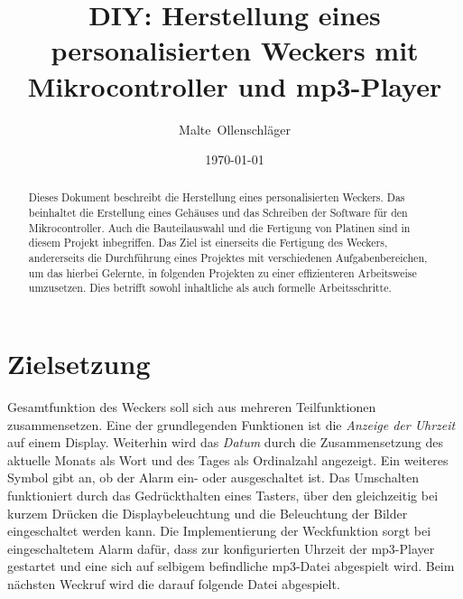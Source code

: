 \documentclass[journal, a4paper]{IEEEtran}
\date{\today}
\author{Malte~Ollenschläger}
\title{DIY: Herstellung eines personalisierten Weckers mit Mikrocontroller und mp3-Player}
\begin{document}
\maketitle
\begin{abstract}
	Dieses Dokument beschreibt die Herstellung eines personalisierten Weckers. Das beinhaltet die Erstellung eines Gehäuses und das Schreiben der Software für den Mikrocontroller. Auch die Bauteilauswahl und die Fertigung von Platinen sind in diesem Projekt inbegriffen. Das Ziel ist einerseits die Fertigung des Weckers, andererseits die Durchführung eines Projektes mit verschiedenen Aufgabenbereichen, um das hierbei Gelernte, in folgenden Projekten zu einer effizienteren Arbeitsweise umzusetzen. Dies betrifft sowohl inhaltliche als auch formelle Arbeitsschritte.
\end{abstract}


\section{Zielsetzung}
	 Gesamtfunktion des Weckers soll sich aus mehreren Teilfunktionen zusammensetzen. Eine der grundlegenden Funktionen ist die \textit{Anzeige der Uhrzeit} auf einem Display. Weiterhin wird das \textit{Datum} durch die Zusammensetzung des aktuelle Monats als Wort und des Tages als Ordinalzahl angezeigt. %
	Ein weiteres Symbol gibt an, ob der Alarm ein- oder ausgeschaltet ist. Das Umschalten funktioniert durch das Gedrückthalten eines Tasters, über den gleichzeitig bei kurzem Drücken die Displaybeleuchtung und die Beleuchtung der Bilder eingeschaltet werden kann. Die Implementierung der Weckfunktion sorgt bei eingeschaltetem Alarm dafür, dass zur konfigurierten Uhrzeit der mp3-Player gestartet und eine sich auf selbigem befindliche mp3-Datei abgespielt wird. Beim nächsten Weckruf wird die darauf folgende Datei abgespielt.\par
\end{document}
